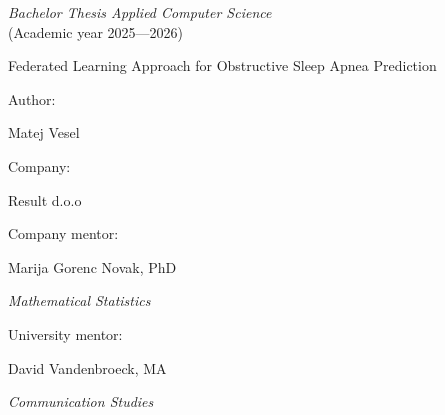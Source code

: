 \centering


\vspace{2cm}
{\LARGE {\textit{Bachelor Thesis Applied Computer Science} \\ (Academic year 2025---2026)} \par}

\vspace{4cm}
{\huge Federated Learning Approach for Obstructive Sleep Apnea Prediction \par}

\raggedright
\vspace{5cm}
{\Large Author: \par}

\vspace{.2cm}
{\Large Matej Vesel \par}

\vspace{0.8cm}
{\Large Company: \par}
{\Large Result d.o.o \par}

\vspace{0.8cm}
{\Large Company mentor: \par}
{\Large Marija Gorenc Novak, PhD \par}
{\Large \emph{Mathematical Statistics} \par}


\vspace{0.8cm}
{\Large University mentor: \par}
{\Large David Vandenbroeck, MA \par}
{\Large \emph{Communication Studies} \par}


\vfill